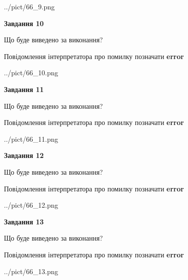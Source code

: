 \documentclass[11pt, ukrainian]{article}
\begin{document}
{\begin {large}
\begin{center}
	{../pict/66_9.png}
\end{center}
\newpage

{\begin {center}\textbf{Завдання 10}\end {center}}\par
Що буде виведено за виконання? \par
Повідомлення інтерпретатора про помилку позначати \textbf{error}

\begin{center}
	{../pict/66_10.png}
\end{center}
\newpage

{\begin {center}\textbf{Завдання 11}\end {center}}\par
Що буде виведено за виконання? \par
Повідомлення інтерпретатора про помилку позначати \textbf{error}

\begin{center}
	{../pict/66_11.png}
\end{center}
\newpage

{\begin {center}\textbf{Завдання 12}\end {center}}\par
Що буде виведено за виконання? \par
Повідомлення інтерпретатора про помилку позначати \textbf{error}

\begin{center}
	{../pict/66_12.png}
\end{center}
\newpage

{\begin {center}\textbf{Завдання 13}\end {center}}\par
Що буде виведено за виконання? \par
Повідомлення інтерпретатора про помилку позначати \textbf{error}

\begin{center}
	{../pict/66_13.png}
\end{center}
\newpage


\end{large}}
\end{document}
